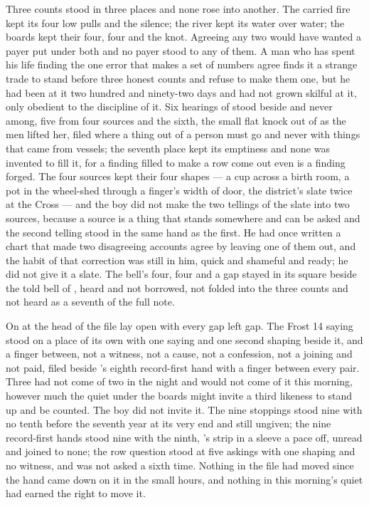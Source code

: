 Three counts stood in three places and none rose into another. The carried fire kept its four low pulls and the silence; the river kept its water over water; the boards kept their four, four and the knot. Agreeing any two would have wanted a payer put under both and no payer stood to any of them. A man who has spent his life finding the one error that makes a set of numbers agree finds it a strange trade to stand before three honest counts and refuse to make them one, but he had been at it two hundred and ninety-two days and had not grown skilful at it, only obedient to the discipline of it. Six hearings of  stood beside and never among, five from four sources and the sixth, the small flat knock out of  as the men lifted her, filed where a thing out of a person must go and never with things that came from vessels; the seventh place kept its emptiness and none was invented to fill it, for a finding filled to make a row come out even is a finding forged. The four sources kept their four shapes --- a cup across a birth room, a pot in the wheel-shed through a finger's width of door, the district's slate twice at the Cross --- and the boy did not make the two tellings of the slate into two sources, because a source is a thing that stands somewhere and can be asked and the second telling stood in the same hand as the first. He had once written a chart that made two disagreeing accounts agree by leaving one of them out, and the habit of that correction was still in him, quick and shameful and ready; he did not give it a slate. The bell's four, four and a gap stayed in its square beside the told bell of , heard and not borrowed, not folded into the three counts and not heard as a seventh of the full note.

On  at the head of  the file lay open with every gap left gap. The Frost 14 saying stood on a place of its own with one saying and one second shaping beside it, and a finger between, not a witness, not a cause, not a confession, not a joining and not paid, filed beside 's eighth record-first hand with a finger between every pair. Three had not come of two in the night and would not come of it this morning, however much the quiet under the boards might invite a third likeness to stand up and be counted. The boy did not invite it. The nine stoppings stood nine with no tenth before the seventh year at its very end and still ungiven; the nine record-first hands stood nine with the ninth, 's strip in a sleeve a pace off, unread and joined to none; the row question stood at five askings with one shaping and no witness, and was not asked a sixth time. Nothing in the file had moved since the hand came down on it in the small hours, and nothing in this morning's quiet had earned the right to move it.

